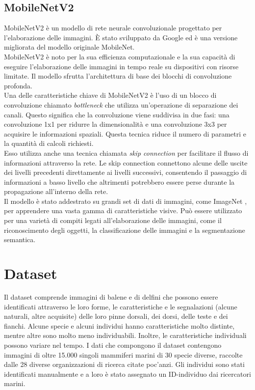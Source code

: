 \documentclass[a4paper,final,12pt]{report}
\begin{document}
\subsection{MobileNetV2}
MobileNetV2 \cite{mobileNet} è un modello di rete neurale convoluzionale progettato per l'elaborazione delle immagini. È stato sviluppato da Google ed è una versione migliorata del modello originale MobileNet.\\
MobileNetV2 è noto per la sua efficienza computazionale e la sua capacità di eseguire l'elaborazione delle immagini in tempo reale su dispositivi con risorse limitate. Il modello sfrutta l'architettura di base dei blocchi di convoluzione profonda.\\
Una delle caratteristiche chiave di MobileNetV2 è l'uso di un blocco di convoluzione chiamato \textit{bottleneck} che utilizza un'operazione di separazione dei canali. Questo significa che la convoluzione viene suddivisa in due fasi: una convoluzione 1x1 per ridurre la dimensionalità e una convoluzione 3x3 per acquisire le informazioni spaziali. Questa tecnica riduce il numero di parametri e la quantità di calcoli richiesti.\\
Esso utilizza anche una tecnica chiamata \textit{skip connection} per facilitare il flusso di informazioni attraverso la rete. Le skip connection connettono alcune delle uscite dei livelli precedenti direttamente ai livelli successivi, consentendo il passaggio di informazioni a basso livello che altrimenti potrebbero essere perse durante la propagazione all'interno della rete.\\Il modello è stato addestrato su grandi set di dati di immagini, come ImageNet \cite{imageNet}, per apprendere una vasta gamma di caratteristiche visive. Può essere utilizzato per una varietà di compiti legati all'elaborazione delle immagini, come il riconoscimento degli oggetti, la classificazione delle immagini e la segmentazione semantica.


\section{Dataset}
Il dataset \cite{dataset} comprende immagini di  balene e di delfini che possono essere identificati attraverso le loro forme, le caratteristiche e le segnalazioni (alcune naturali, altre acquisite) delle loro pinne dorsali, dei dorsi, delle teste e dei fianchi. Alcune specie e alcuni individui hanno caratteristiche molto distinte, mentre altre sono molto meno individuabili. Inoltre, le caratteristiche individuali possono variare nel tempo. I dati che compongono il dataset contengono immagini di oltre 15.000 singoli mammiferi marini di 30 specie diverse, raccolte dalle 28 diverse organizzazioni di ricerca citate poc'anzi. Gli individui sono stati identificati manualmente e a loro è stato assegnato un ID-individuo dai ricercatori marini.
\end{document}
